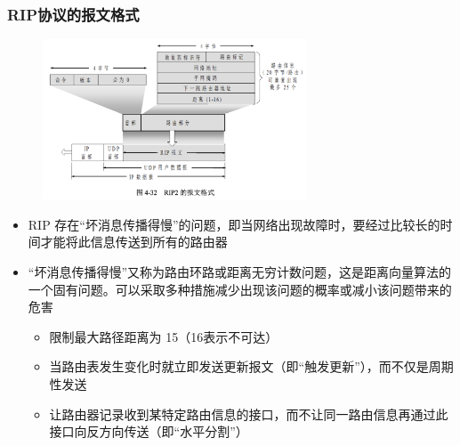 \documentclass[cs4size,a4paper,10pt]{ctexart}
\begin{document}
	\subsubsection{RIP协议的报文格式}
	\begin{figure}[H]
		\centering
		\includegraphics[width=0.7\textwidth]{img/4.32}
	\end{figure}

	\begin{itemize}
		\item RIP 存在“坏消息传播得慢”的问题，即当网络出现故障时，要经过比较长的时间才能将此信息传送到所有的路由器
		\item “坏消息传播得慢”又称为路由环路或距离无穷计数问题，这是距离向量算法的一个固有问题。可以采取多种措施减少出现该问题的概率或减小该问题带来的危害
		\begin{itemize}
			\item 限制最大路径距离为 15（16表示不可达）
			\item 当路由表发生变化时就立即发送更新报文（即“触发更新”），而不仅是周期性发送
			\item 让路由器记录收到某特定路由信息的接口，而不让同一路由信息再通过此接口向反方向传送（即“水平分割”）
		\end{itemize}
	\end{itemize}
\end{document}
